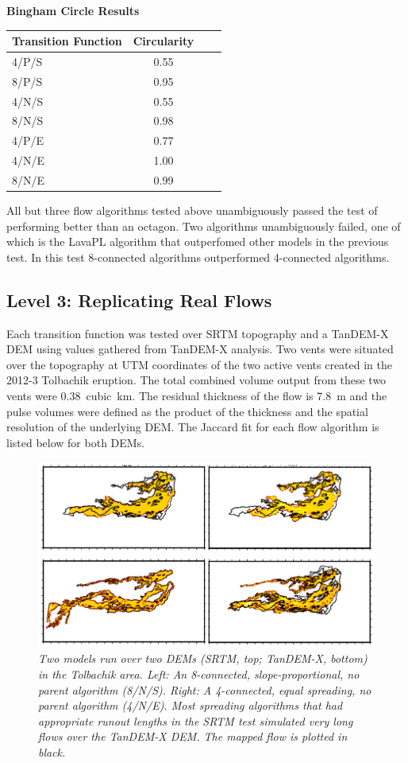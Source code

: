 \documentclass[12pt,letter]{article}
\begin{document}
		
		\begin{center}
			\textbf{Bingham Circle Results}\\
			\begin{tabular}{l c c c}
				\toprule
				Transition Function&Circularity\\
				\midrule
				4/P/S & 0.55\\
				8/P/S & 0.95\\
				4/N/S & 0.55\\
				8/N/S & 0.98\\
				4/P/E & 0.77\\
				4/N/E & 1.00\\
				8/N/E & 0.99\\
				
				\bottomrule
			\end{tabular}
		\end{center}
		
		All but three flow algorithms tested above unambiguously passed the test of performing better than an octagon. Two algorithms unambiguously failed, one of which is the LavaPL algorithm that outperfomed other models in the previous test. In this test 8-connected algorithms outperformed 4-connected algorithms.

	\subsection{Level 3: Replicating Real Flows}
	
	Each transition function was tested over SRTM topography and a TanDEM-X DEM using values gathered from TanDEM-X analysis. Two vents were situated over the topography at UTM coordinates of the two active vents created in the 2012-3 Tolbachik eruption. The total combined volume output from these two vents were 0.38~cubic~km. The residual thickness of the flow is 7.8~m and the pulse volumes were defined as the product of the thickness and the spatial resolution of the underlying DEM. The Jaccard fit for each flow algorithm is listed below for both DEMs.
		\begin{figure}[!h]
			\centering
			\includegraphics[width=0.7\linewidth]{figures/tolbachik}
			\caption{\textit{Two models run over two DEMs (SRTM, top; TanDEM-X, bottom) in the Tolbachik area. Left: An 8-connected, slope-proportional, no parent algorithm (8/N/S). Right: A 4-connected, equal spreading, no parent algorithm (4/N/E). Most spreading algorithms that had appropriate runout lengths in the SRTM test simulated very long flows over the TanDEM-X DEM. The mapped flow is plotted in black.}}
			\label{fig:tolbachik}
		\end{figure}
		
\end{document}
